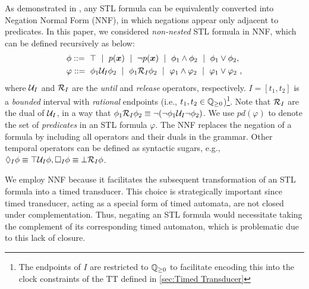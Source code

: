     As demonstrated in \cite{fainekos2009robustness}, any STL formula can be equivalently converted into Negation Normal Form (NNF), in which negations appear only adjacent to predicates. In this paper, we considered \emph{non-nested} STL formula in NNF, which can be defined recursively as below:
        \begin{align*}
            &\phi \Def ~ \top ~\mid~ p(\signal) ~\mid~ \neg p(\signal) ~\mid~ \phi_1 \land \phi_2 ~\mid~ \phi_1 \lor \phi_2,\\ %
            &\varphi \Def ~ \phi_1 \until[I] \phi_2 ~\mid~ \phi_1 \release[I] \phi_2 ~\mid~ \varphi_1 \land \varphi_2 ~\mid~ \varphi_1 \lor \varphi_2~, %
        \end{align*}
        where $\until_I$ and $\release_I$ are the \emph{until} and \emph{release} operators, respectively. $I=[t_1,t_2]$ is a \emph{bounded} interval with \emph{rational} endpoints (i.e., $t_1,t_2\in\mathbb{Q}_{\ge 0}$)\footnote{The endpoints of $I$ are restricted to $\mathbb{Q}_{\ge 0}$ to facilitate encoding this into the clock constraints of the TT defined in \cref{sec:Timed Transducer}}. Note that $\release_I$ are the dual of $\until_I$, in a way that $\phi_1\release_I\phi_2\equiv\neg(\neg\phi_1\until_I\neg\phi_2)$. We use $pd(\varphi)$ to denote the set of \emph{predicates} in an STL formula $\varphi$. The NNF replaces the negation of a formula by including all operators and their duals in the grammar. Other temporal operators can be defined as syntactic sugars, e.g., 
            $\eventually_I\phi \equiv \top \until_I \phi,
            \always_I \phi \equiv \bot \release_I \phi$.
    \begin{remark}
        We employ NNF because it facilitates the subsequent transformation of an STL formula into a timed transducer. This choice is strategically important since timed transducer, acting as a special form of timed automata, are not closed under complementation. Thus, negating an STL formula would necessitate taking the complement of its corresponding timed automaton, which is problematic due to this lack of closure. 
    \end{remark}

